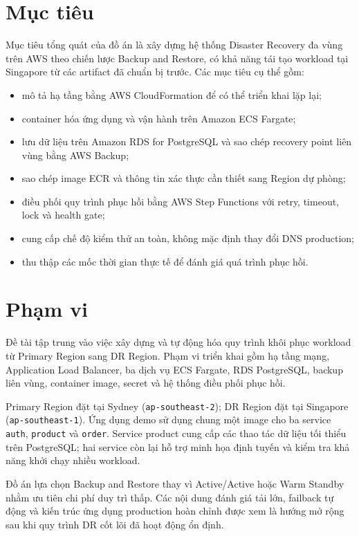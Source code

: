 \section{Mục tiêu}

Mục tiêu tổng quát của đồ án là xây dựng hệ thống Disaster Recovery đa vùng trên AWS theo chiến lược Backup and Restore, có khả năng tái tạo workload tại Singapore từ các artifact đã chuẩn bị trước. Các mục tiêu cụ thể gồm:

\begin{itemize}
  \item mô tả hạ tầng bằng AWS CloudFormation để có thể triển khai lặp lại;
  \item container hóa ứng dụng và vận hành trên Amazon ECS Fargate;
  \item lưu dữ liệu trên Amazon RDS for PostgreSQL và sao chép recovery point liên vùng bằng AWS Backup;
  \item sao chép image ECR và thông tin xác thực cần thiết sang Region dự phòng;
  \item điều phối quy trình phục hồi bằng AWS Step Functions với retry, timeout, lock và health gate;
  \item cung cấp chế độ kiểm thử an toàn, không mặc định thay đổi DNS production;
  \item thu thập các mốc thời gian thực tế để đánh giá quá trình phục hồi.
\end{itemize}

\section{Phạm vi}

Đề tài tập trung vào việc xây dựng và tự động hóa quy trình khôi phục workload từ Primary Region sang DR Region. Phạm vi triển khai gồm hạ tầng mạng, Application Load Balancer, ba dịch vụ ECS Fargate, RDS PostgreSQL, backup liên vùng, container image, secret và hệ thống điều phối phục hồi.

Primary Region đặt tại Sydney (\texttt{ap-southeast-2}); DR Region đặt tại Singapore (\texttt{ap-southeast-1}). Ứng dụng demo sử dụng chung một image cho ba service \texttt{auth}, \texttt{product} và \texttt{order}. Service product cung cấp các thao tác dữ liệu tối thiểu trên PostgreSQL; hai service còn lại hỗ trợ minh họa định tuyến và kiểm tra khả năng khởi chạy nhiều workload.

Đồ án lựa chọn Backup and Restore thay vì Active/Active hoặc Warm Standby nhằm ưu tiên chi phí duy trì thấp. Các nội dung đánh giá tải lớn, failback tự động và kiến trúc ứng dụng production hoàn chỉnh được xem là hướng mở rộng sau khi quy trình DR cốt lõi đã hoạt động ổn định.

